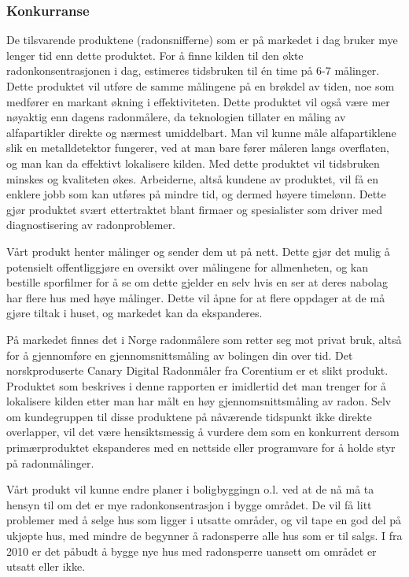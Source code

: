 \subsubsection{Konkurranse}
De tilsvarende produktene (radonsnifferne) som er på markedet i dag bruker mye lenger tid enn dette produktet. For å finne kilden til den økte radonkonsentrasjonen i dag, estimeres tidsbruken til én time på 6-7 målinger. Dette produktet vil utføre de samme målingene på en brøkdel av tiden, noe som medfører en markant økning i effektiviteten. Dette produktet vil også være mer nøyaktig enn dagens radonmålere, da teknologien tillater en måling av alfapartikler direkte og nærmest umiddelbart. Man vil kunne måle alfapartiklene slik en metalldetektor fungerer, ved at man bare fører måleren langs overflaten, og man kan da effektivt lokalisere kilden. Med dette produktet vil tidsbruken minskes og kvaliteten økes. Arbeiderne, altså kundene av produktet, vil få en enklere jobb som kan utføres på mindre tid, og dermed høyere timelønn. Dette gjør produktet svært ettertraktet blant firmaer og spesialister som driver med diagnostisering av radonproblemer.

Vårt produkt henter målinger og sender dem ut på nett. Dette gjør det mulig å potensielt offentliggjøre en oversikt over målingene for allmenheten, og kan bestille sporfilmer for å se om dette gjelder en selv hvis en ser at deres nabolag har flere hus med høye målinger. Dette vil åpne for at flere oppdager at de må gjøre tiltak i huset, og markedet kan da ekspanderes.

På markedet finnes det i Norge radonmålere som retter seg mot privat bruk, altså for å gjennomføre en gjennomsnittsmåling av bolingen din over tid. Det norskproduserte Canary Digital Radonmåler fra Corentium er et slikt produkt. Produktet som beskrives i denne rapporten er imidlertid det man trenger for å lokalisere kilden etter man har målt en høy gjennomsnittsmåling av radon. Selv om kundegruppen til disse produktene på nåværende tidspunkt ikke direkte overlapper, vil det være hensiktsmessig å vurdere dem som en konkurrent dersom primærproduktet ekspanderes med en nettside eller programvare for å holde styr på radonmålinger.

Vårt produkt vil kunne endre planer i boligbyggingn o.l. ved at de nå må ta hensyn til om det er mye radonkonsentrasjon
i bygge området. De vil få litt problemer med å selge hus som ligger i utsatte områder, og vil tape en god del på
ukjøpte hus, med mindre de begynner å radonsperre alle hus som er til salgs. I fra 2010 er det påbudt å bygge nye 
hus med radonsperre uansett om området er utsatt eller ikke.
